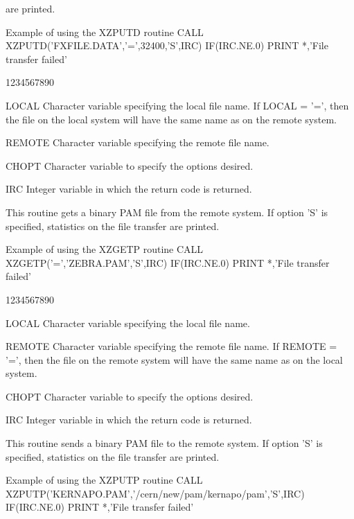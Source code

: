 are printed.
\begin{XMPt}{Example of using the XZPUTD routine}
      CALL XZPUTD('FXFILE.DATA','=',32400,'S',IRC)
      IF(IRC.NE.0) PRINT *,'File transfer failed'
\end{XMPt}
\begin{DLtt}{1234567890}
\item[LOCAL]Character variable specifying the local file name.
If LOCAL = '=', then the file on the local system will
have the same name as on the remote system.
\item[REMOTE]Character variable specifying the remote file name.
\item[CHOPT]Character variable to specify the options desired.
\item[IRC]Integer variable in which the return code is returned.
\end{DLtt}
\par
This routine gets a binary PAM file from the remote system.
If option 'S' is specified, statistics on the file transfer
are printed.
\begin{XMPt}{Example of using the XZGETP routine}
      CALL XZGETP('=','ZEBRA.PAM','S',IRC)
      IF(IRC.NE.0) PRINT *,'File transfer failed'
\end{XMPt}
\begin{DLtt}{1234567890}
\item[LOCAL]Character variable specifying the local file name.
\item[REMOTE]Character variable specifying the remote file name.
If REMOTE = '=', then the file on the remote system will
have the same name as on the local system.
\item[CHOPT]Character variable to specify the options desired.
\item[IRC]Integer variable in which the return code is returned.
\end{DLtt}
\par
This routine sends a binary PAM file to the remote system.
If option 'S' is specified, statistics on the file transfer
are printed.
\begin{XMPt}{Example of using the XZPUTP routine}
      CALL XZPUTP('KERNAPO.PAM','/cern/new/pam/kernapo/pam','S',IRC)
      IF(IRC.NE.0) PRINT *,'File transfer failed'
\end{XMPt}
